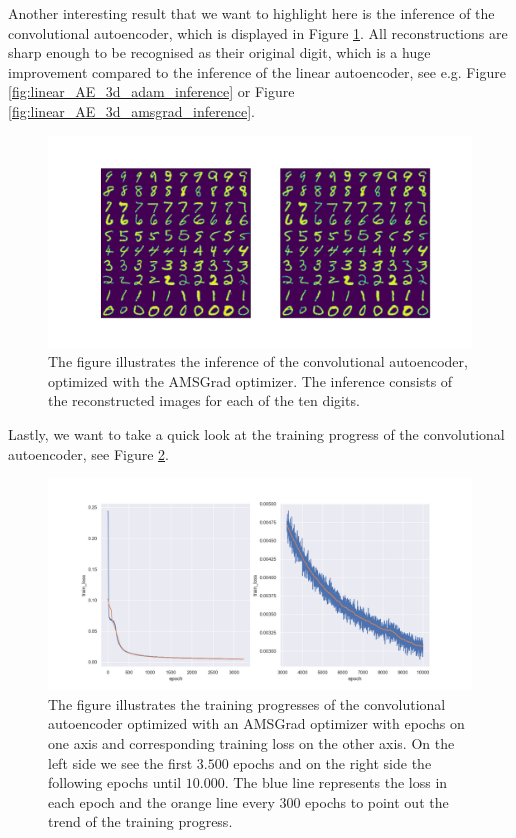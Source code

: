 Another interesting result that we want to highlight here is the inference of the convolutional autoencoder, which is displayed in Figure \ref{fig:convolutional_AE_inference}. All reconstructions are sharp enough to be recognised as their original digit, which is a huge improvement compared to the inference of the linear autoencoder, see e.g. Figure \ref{fig:linear_AE_3d_adam_inference} or Figure \ref{fig:linear_AE_3d_amsgrad_inference}.


\begin{figure}
\begin{center}
\includegraphics[width=0.7\linewidth]{convolutional_AE_inference}
\end{center}
\caption{The figure illustrates the inference of the convolutional autoencoder, optimized with the AMSGrad optimizer. The inference consists of the reconstructed images for each of the ten digits.}\label{fig:convolutional_AE_inference}
\end{figure}


Lastly, we want to take a quick look at the training progress of the convolutional autoencoder, see Figure \ref{fig:convolutional_AE_training_progress}.

\begin{figure}
\begin{center}
\includegraphics[width=\linewidth]{convolutional_AE_training_progress}
\end{center}
\caption{The figure illustrates the training progresses of the convolutional autoencoder optimized with an AMSGrad optimizer  with epochs on one axis and corresponding training loss on the other axis. On the left side we see the first $3.500$ epochs and on the right side the following epochs until $10.000$. The blue line represents the loss in each epoch and the orange line every $300$ epochs to point out the trend of the training progress.}\label{fig:convolutional_AE_training_progress}
\end{figure}
